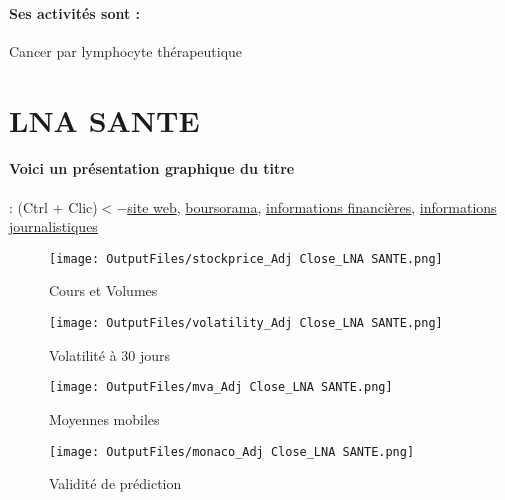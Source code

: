 \documentclass[11pt,a4paper]{report}%
\begin{document}
\paragraph{Ses activités sont : } Cancer par lymphocyte thérapeutique 
    
    \newpage

\section{LNA SANTE}

\paragraph{Voici un présentation graphique du titre} : (Ctrl + Clic)$<-$\href{https://www.lna-sante.com/}{site web}, \href{https://www.boursorama.com/cours/1rPLNA}{boursorama}, \href{https://www.qwant.com/?q=site:https:%2f%2fwww.easybourse.com%2faction-societe%2fLNA-SANTE&t=web&client=ext-firefox-hp}{informations financières}, \href{https://bourse.lerevenu.com/cours-de-bourse/fiche-valeur-synthese/LNA-SANTE/LNA-FR}{informations journalistiques}
\begin{figure}[!htb]
   \begin{minipage}{0.5\textwidth}
     \centering
     \texttt{[image: OutputFiles/stockprice\_Adj Close\_LNA SANTE.png]}
     \caption{Cours et Volumes}\label{Fig:price_LNA SANTE}
   \end{minipage}\hfill
   \begin{minipage}{0.5\textwidth}
     \centering
     \texttt{[image: OutputFiles/volatility\_Adj Close\_LNA SANTE.png]}
     \caption{Volatilité à 30 jours}\label{Fig:volat_LNA SANTE}
   \end{minipage}
\end{figure}
\begin{figure}[!htb]
   \begin{minipage}{0.5\textwidth}
     \centering
     \texttt{[image: OutputFiles/mva\_Adj Close\_LNA SANTE.png]}
     \caption{Moyennes mobiles}\label{Fig:mva_LNA SANTE}
   \end{minipage}\hfill
   \begin{minipage}{0.5\textwidth}
     \centering
     \texttt{[image: OutputFiles/monaco\_Adj Close\_LNA SANTE.png]}
     \caption{Validité de prédiction}\label{Fig:prediction_LNA SANTE}
   \end{minipage}
\end{figure}
\end{document}
